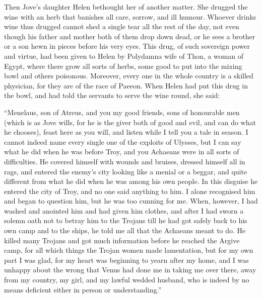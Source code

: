 Then Jove’s daughter Helen bethought her of another matter. She drugged the
wine with an herb that banishes all care, sorrow, and ill humour. Whoever
drinks wine thus drugged cannot shed a single tear all the rest of the day, not
even though his father and mother both of them drop down dead, or he sees a
brother or a son hewn in pieces before his very eyes. This drug, of such
sovereign power and virtue, had been given to Helen by Polydamna wife of Thon,
a woman of Egypt, where there grow all sorts of herbs, some good to put into
the mixing bowl and others poisonous. Moreover, every one in the whole country
is a skilled physician, for they are of the race of Paeeon. When Helen had put
this drug in the bowl, and had told the servants to serve the wine round, she
said:

“Menelaus, son of Atreus, and you my good friends, sons of honourable men
(which is as Jove wills, for he is the giver both of good and evil, and can do
what he chooses), feast here as you will, and listen while I tell you a tale in
season. I cannot indeed name every single one of the exploits of Ulysses, but I
can say what he did when he was before Troy, and you Achaeans were in all sorts
of difficulties. He covered himself with wounds and bruises, dressed himself
all in rags, and entered the enemy’s city looking like a menial or a beggar,
and quite different from what he did when he was among his own people. In this
disguise he entered the city of Troy, and no one said anything to him. I alone
recognised him and began to question him, but he was too cunning for me. When,
however, I had washed and anointed him and had given him clothes, and after I
had sworn a solemn oath not to betray him to the Trojans till he had got safely
back to his own camp and to the ships, he told me all that the Achaeans meant
to do. He killed many Trojans and got much information before he reached the
Argive camp, for all which things the Trojan women made lamentation, but for my
own part I was glad, for my heart was beginning to yearn after my home, and I
was unhappy about the wrong that Venus had done me in taking me over there,
away from my country, my girl, and my lawful wedded husband, who is indeed by
no means deficient either in person or understanding.”

